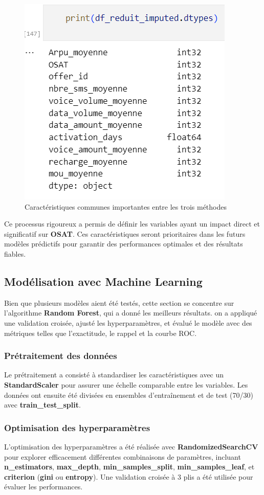 \begin{figure}[H]
    \centering
    \includegraphics[width=0.4\linewidth]{capture_sas_69.png}
    \caption{Caractéristiques communes importantes entre les trois méthodes}
\end{figure}

Ce processus rigoureux a permis de définir les variables ayant un impact direct et significatif sur \textbf{OSAT}. Ces caractéristiques seront prioritaires dans les futurs modèles prédictifs pour garantir des performances optimales et des résultats fiables.

\subsection{Modélisation avec Machine Learning}

Bien que plusieurs modèles aient été testés, cette section se concentre sur l'algorithme \textbf{Random Forest}, qui a donné les meilleurs résultats. on a appliqué une validation croisée, ajusté les hyperparamètres, et évalué le modèle avec des métriques telles que l'exactitude, le rappel et la courbe ROC.

\subsubsection{Prétraitement des données}
Le prétraitement a consisté à standardiser les caractéristiques avec un \textbf{StandardScaler} pour assurer une échelle comparable entre les variables. Les données ont ensuite été divisées en ensembles d'entraînement et de test (70/30) avec \textbf{train\_test\_split}.

\subsubsection{Optimisation des hyperparamètres}
L'optimisation des hyperparamètres a été réalisée avec \textbf{RandomizedSearchCV} pour explorer efficacement différentes combinaisons de paramètres, incluant \textbf{n\_estimators}, \textbf{max\_depth}, \textbf{min\_samples\_split}, \textbf{min\_samples\_leaf}, et \textbf{criterion} (\textbf{gini} ou \textbf{entropy}). Une validation croisée à 3 plis a été utilisée pour évaluer les performances.

